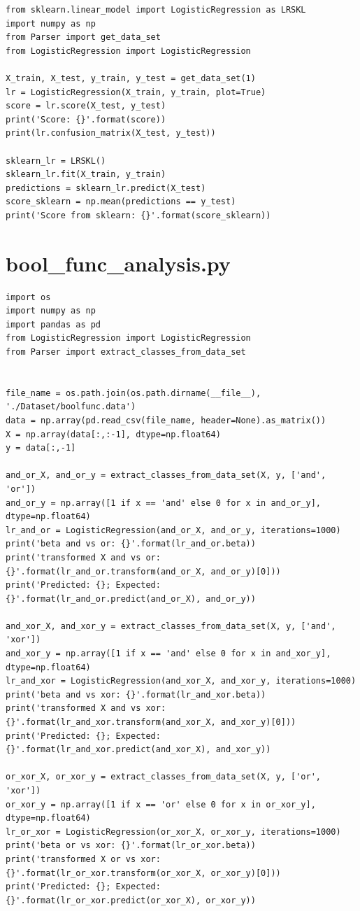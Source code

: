\begin{lstlisting}[style=py]
from sklearn.linear_model import LogisticRegression as LRSKL
import numpy as np
from Parser import get_data_set
from LogisticRegression import LogisticRegression

X_train, X_test, y_train, y_test = get_data_set(1)
lr = LogisticRegression(X_train, y_train, plot=True)
score = lr.score(X_test, y_test)
print('Score: {}'.format(score))
print(lr.confusion_matrix(X_test, y_test))

sklearn_lr = LRSKL()
sklearn_lr.fit(X_train, y_train)
predictions = sklearn_lr.predict(X_test)
score_sklearn = np.mean(predictions == y_test)
print('Score from sklearn: {}'.format(score_sklearn))

\end{lstlisting}

\section*{bool\_func\_analysis.py}

\begin{lstlisting}[style=py]
import os
import numpy as np
import pandas as pd
from LogisticRegression import LogisticRegression
from Parser import extract_classes_from_data_set


file_name = os.path.join(os.path.dirname(__file__), './Dataset/boolfunc.data')
data = np.array(pd.read_csv(file_name, header=None).as_matrix())
X = np.array(data[:,:-1], dtype=np.float64)
y = data[:,-1]

and_or_X, and_or_y = extract_classes_from_data_set(X, y, ['and', 'or'])
and_or_y = np.array([1 if x == 'and' else 0 for x in and_or_y], dtype=np.float64)
lr_and_or = LogisticRegression(and_or_X, and_or_y, iterations=1000)
print('beta and vs or: {}'.format(lr_and_or.beta))
print('transformed X and vs or: {}'.format(lr_and_or.transform(and_or_X, and_or_y)[0]))
print('Predicted: {}; Expected: {}'.format(lr_and_or.predict(and_or_X), and_or_y))

and_xor_X, and_xor_y = extract_classes_from_data_set(X, y, ['and', 'xor'])
and_xor_y = np.array([1 if x == 'and' else 0 for x in and_xor_y], dtype=np.float64)
lr_and_xor = LogisticRegression(and_xor_X, and_xor_y, iterations=1000)
print('beta and vs xor: {}'.format(lr_and_xor.beta))
print('transformed X and vs xor: {}'.format(lr_and_xor.transform(and_xor_X, and_xor_y)[0]))
print('Predicted: {}; Expected: {}'.format(lr_and_xor.predict(and_xor_X), and_xor_y))

or_xor_X, or_xor_y = extract_classes_from_data_set(X, y, ['or', 'xor'])
or_xor_y = np.array([1 if x == 'or' else 0 for x in or_xor_y], dtype=np.float64)
lr_or_xor = LogisticRegression(or_xor_X, or_xor_y, iterations=1000)
print('beta or vs xor: {}'.format(lr_or_xor.beta))
print('transformed X or vs xor: {}'.format(lr_or_xor.transform(or_xor_X, or_xor_y)[0]))
print('Predicted: {}; Expected: {}'.format(lr_or_xor.predict(or_xor_X), or_xor_y))

\end{lstlisting}


